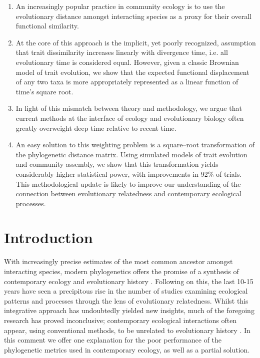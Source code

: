 \begin{enumerate}

\item{ 
An increasingly popular practice in community ecology is to use the 
evolutionary distance amongst interacting species as a proxy for their 
overall functional similarity.
}

\item{
At the core of this approach is the  implicit, yet poorly recognized, 
assumption that trait dissimilarity increases linearly with divergence time, 
i.e. all evolutionary time is considered equal. However, given a classic 
Brownian model of trait evolution, we show that the expected functional 
displacement of any two taxa is more appropriately represented as a linear 
function of time's square root. 
}
\item{
In light of this mismatch between theory and methodology, we argue that
current methods at the interface of ecology and evolutionary biology often greatly 
overweight deep time relative to recent time. 
}
\item{
An easy solution to this weighting problem is a square--root transformation of 
the phylogenetic distance matrix. Using simulated models of trait evolution 
and community assembly, we show that this transformation yields considerably 
higher statistical power, with improvements in 92\% of trials. This methodological update is likely to improve our understanding of the connection between evolutionary relatedness and contemporary ecological processes.
}
\end{enumerate}

\newpage

\section{Introduction}

With increasingly precise estimates of the most common ancestor amongst interacting species, modern phylogenetics offers the 
promise of a synthesis of contemporary ecology and evolutionary history \citep{Webb2002, Johnson2007, Cavender-Bares2009, cadotte2013, 
Swenson2013}. Following on this, the last 10-15 years have seen a precipitous rise in the number of studies examining ecological 
patterns and processes through the lens of evolutionary relatedness. Whilst this integrative approach has undoubtedly yielded new 
insights, much of the foregoing research has proved inconclusive; contemporary ecological interactions often appear, using 
conventional methods, to be unrelated to evolutionary history \citep{Cahill2008, Bennett2013, Narwani2013, Fritschie2013}. In this 
comment we offer one explanation for the poor performance of the phylogenetic metrics used in contemporary ecology, as well as a 
partial solution.

